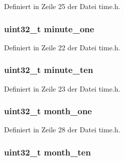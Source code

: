 Definiert in Zeile 25 der Datei time.\+h.

\hypertarget{structtime__date_aeb047e7931fb6cd6e4c751d8143c16a4}{}
\subsubsection[{minute\+\_\+one}]{\setlength{\rightskip}{0pt plus 5cm}uint32\+\_\+t minute\+\_\+one}\label{structtime__date_aeb047e7931fb6cd6e4c751d8143c16a4}


Definiert in Zeile 22 der Datei time.\+h.

\hypertarget{structtime__date_a2659c12e8307db4c98ce9cb1bf53bc0e}{}
\subsubsection[{minute\+\_\+ten}]{\setlength{\rightskip}{0pt plus 5cm}uint32\+\_\+t minute\+\_\+ten}\label{structtime__date_a2659c12e8307db4c98ce9cb1bf53bc0e}


Definiert in Zeile 23 der Datei time.\+h.

\hypertarget{structtime__date_a6ad3129035cd14cf22da6e4a1fecf018}{}
\subsubsection[{month\+\_\+one}]{\setlength{\rightskip}{0pt plus 5cm}uint32\+\_\+t month\+\_\+one}\label{structtime__date_a6ad3129035cd14cf22da6e4a1fecf018}


Definiert in Zeile 28 der Datei time.\+h.

\hypertarget{structtime__date_afadd8a2137e5a4d272d63e02386c2bd8}{}
\subsubsection[{month\+\_\+ten}]{\setlength{\rightskip}{0pt plus 5cm}uint32\+\_\+t month\+\_\+ten}\label{structtime__date_afadd8a2137e5a4d272d63e02386c2bd8}


